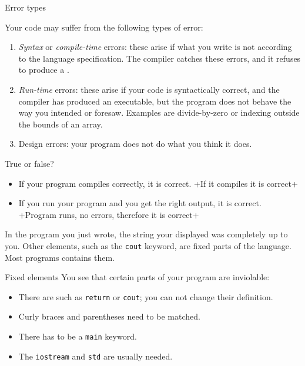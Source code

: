 \begin{block}{Error types}
  \label{sl:program-errors}
\begin{slideonly}
Your code may suffer from the following types of error:    
\end{slideonly}
  \begin{enumerate}
  \item \emph{Syntax} or
    \emph{compile-time} errors: these arise
    if what you write is not according to the language specification.
    The compiler catches these errors, and it refuses to produce a
    .
  \item \emph{Run-time} errors: these arise if
    your code is syntactically correct, and the compiler has produced
    an executable, but the program does not behave the way you
    intended or foresaw. Examples are divide-by-zero or indexing
    outside the bounds of an array.
  \item Design errors: your program does not do what you think it does.
  \end{enumerate}
\end{block}

\begin{review}
  \label{q:compile}
  True or false?
  \begin{itemize}
  \item If your program compiles correctly, it is correct.
    \slackpollTF+If it compiles it is correct+
  \item If you run your program and you get the right output, it is correct.
    \slackpollTF+Program runs, no errors, therefore it is correct+
  \end{itemize}  
\end{review}

In the program you just wrote, the string your displayed
was completely up to you. Other elements, such as the \lstinline{cout}
keyword, are fixed parts of the language.
Most programs contains them.

\begin{block}{Fixed elements}
  \label{sl:fixedstuff}
  You see that certain parts of your program are inviolable:
  \begin{itemize}
  \item There are  such as \lstinline{return} or \lstinline{cout}; you
    can not change their definition.
  \item Curly braces and parentheses need to be matched.
  \item There has to be a \lstinline{main} keyword.
  \item The \lstinline{iostream} and \lstinline{std} are usually needed.
  \end{itemize}
\end{block}

